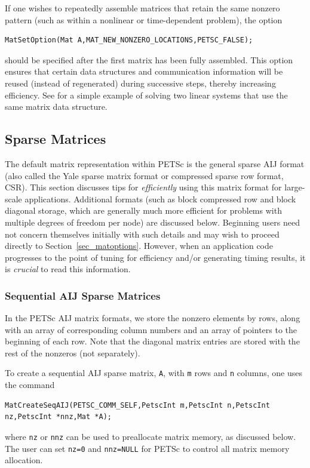 If one wishes to repeatedly assemble matrices that retain the same
nonzero pattern (such as within a nonlinear or time-dependent
problem), the option
\begin{lstlisting}
MatSetOption(Mat A,MAT_NEW_NONZERO_LOCATIONS,PETSC_FALSE);
\end{lstlisting} 
should be specified after the first matrix has been fully assembled.
This option ensures that certain data structures and communication
information will be reused (instead of regenerated) during successive
steps, thereby increasing efficiency.
See \href{https://www.mcs.anl.gov/petsc/petsc-current/src/ksp/ksp/tutorials/ex5.c.html}{} for a simple example of
solving two linear systems that use the same matrix data structure.

\subsection{Sparse Matrices}
\label{sec_matsparse}

 
The default matrix representation within PETSc is the general sparse
AIJ format (also called the Yale sparse matrix format or compressed
sparse row format, CSR).  This section discusses tips for {\em
efficiently} using this matrix format for large-scale
applications. Additional formats (such as block compressed row and
block diagonal storage, which are generally much more efficient for
problems with multiple degrees of freedom per node) are discussed
below.  Beginning users need not concern themselves initially with
such details and may wish to proceed directly to
Section~\ref{sec_matoptions}.  However, when an application code
progresses to the point of tuning for efficiency and/or generating
timing results, it is {\em crucial} to read this information.

\subsubsection{Sequential AIJ Sparse Matrices}

In the PETSc AIJ matrix formats, we store the nonzero elements
by rows, along with an array of corresponding column numbers and
an array of pointers to the beginning of each row.  Note that the
diagonal matrix entries are stored with the rest of the nonzeros (not
separately).

To create a sequential AIJ sparse matrix, \lstinline{A},
with \lstinline{m} rows and \lstinline{n} columns,
one uses the command
\begin{lstlisting}
MatCreateSeqAIJ(PETSC_COMM_SELF,PetscInt m,PetscInt n,PetscInt nz,PetscInt *nnz,Mat *A);
\end{lstlisting}
where \lstinline{nz} or \lstinline{nnz} can be used to preallocate matrix memory,
as discussed below. The user can set \lstinline{nz=0} and \lstinline{nnz=NULL} for PETSc to control all matrix memory allocation.

